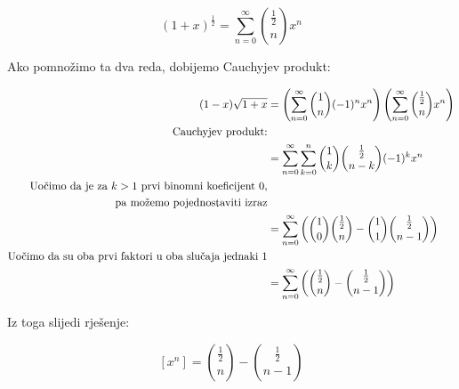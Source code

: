 \documentclass[exam.tex]{subfiles}
\begin{document}
	\[ (1 + x)^{\frac{1}{2}} = \sum\limits^\infty_{n=0} \binom{\frac{1}{2}}{n} x^n \]
	
	Ako pomnožimo ta dva reda, dobijemo Cauchyjev produkt:
	
	\begin{align*}
		(1 - x) \sqrt{1 + x} &= \left ( \sum\limits^\infty_{n=0} \binom{1}{n} (-1)^n x^n \right ) \left ( \sum\limits^\infty_{n=0} \binom{\frac{1}{2}}{n} x^n \right ) \\
		\text{Cauchyjev produkt:} \\
		&= \sum\limits^\infty_{n=0} \sum\limits^n_{k=0} \binom{1}{k} \binom{\frac{1}{2}}{n - k} (-1)^k x^n \\
		\text{Uočimo da je za \( k > 1 \) prvi binomni koeficijent 0,} \\
		\text{ pa možemo pojednostaviti izraz} \\
		&= \sum\limits^\infty_{n=0} \left ( \binom{1}{0} \binom{\frac{1}{2}}{n} - \binom{1}{1} \binom{\frac{1}{2}}{n - 1} \right ) \\
		\text{Uočimo da su oba prvi faktori u oba slučaja jednaki 1} \\
		&= \sum\limits^\infty_{n=0} \left ( \binom{\frac{1}{2}}{n} - \binom{\frac{1}{2}}{n - 1} \right ) \\
	\end{align*}
	
	Iz toga slijedi rješenje:
	
	\[ [x^n] = \binom{\frac{1}{2}}{n} - \binom{\frac{1}{2}}{n - 1} \]
\end{document}
